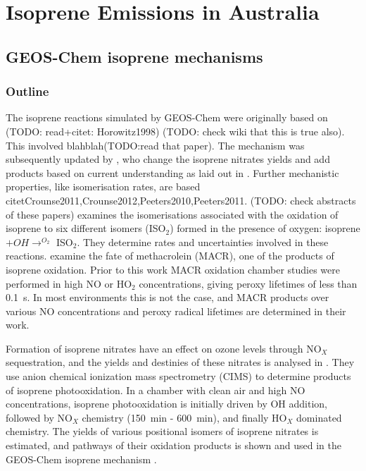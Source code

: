 
\chapter{Isoprene Emissions in Australia} %
\label{ch_isop}

\section{GEOS-Chem isoprene mechanisms}
\label{ch_isop:sec:GEOSChemMechanisms}
  \subsection{Outline}
    The isoprene reactions simulated by GEOS-Chem were originally based on (TODO: read+citet: Horowitz1998) (TODO: check wiki that this is true also).
    This involved blahblah(TODO:read that paper).
    The mechanism was subsequently updated by \citet{Mao2013}, who change the isoprene nitrates yields and add products based on current understanding as laid out in \citet{Paulot2009a,Paulot2009b}.
    Further mechanistic properties, like isomerisation rates, are based citet{Crounse2011,Crounse2012,Peeters2010,Peeters2011}.
    (TODO: check abstracts of these papers)
    \cite{Crounse2011} examines the isomerisations associated with the oxidation of isoprene to six different isomers (ISO$_2$) formed in the presence of oxygen: isoprene $ + OH \rightarrow^{O_2} $ ISO$_2$.
    They determine rates and uncertainties involved in these reactions.
    \cite{Crounse2012} examine the fate of methacrolein (MACR), one of the products of isoprene oxidation. 
    Prior to this work MACR oxidation chamber studies were performed in high NO or HO$_2$ concentrations, giving peroxy lifetimes of less than 0.1~s.
    In most environments this is not the case, and MACR products over various NO concentrations and peroxy radical lifetimes are determined in their work.
    
    Formation of isoprene nitrates have an effect on ozone levels through NO$_X$ sequestration, and the yields and destinies of these nitrates is analysed in \citet{Paulot2009a}. 
    They use anion chemical ionization mass spectrometry (CIMS) to determine products of isoprene photooxidation.
    In a chamber with clean air and high NO concentrations, isoprene photooxidation is initially driven by OH addition, followed by NO$_X$ chemistry (150~min - 600~min), and finally HO$_X$ dominated chemistry.
    The yields of various positional isomers of isoprene nitrates is estimated, and pathways of their oxidation products is shown and used in the GEOS-Chem isoprene mechanism \citep{Paulot2009a,Mao2013}. 
    
